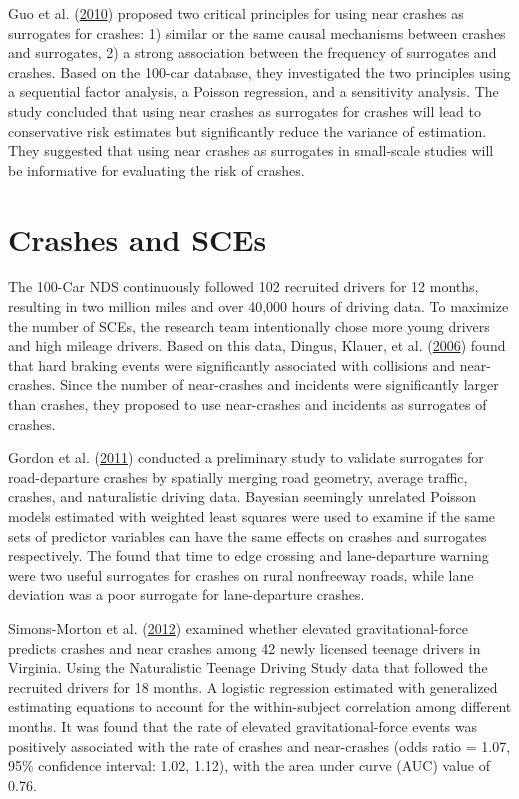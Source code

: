 \documentclass[12pt]{book}
\numberwithin{equation}{chapter}
\begin{document}
Guo et al. (\protect\hyperlink{ref-guo2010near}{2010}) proposed two critical principles for using near crashes as surrogates for crashes: 1) similar or the same causal mechanisms between crashes and surrogates, 2) a strong association between the frequency of surrogates and crashes. Based on the 100-car database, they investigated the two principles using a sequential factor analysis, a Poisson regression, and a sensitivity analysis. The study concluded that using near crashes as surrogates for crashes will lead to conservative risk estimates but significantly reduce the variance of estimation. They suggested that using near crashes as surrogates in small-scale studies will be informative for evaluating the risk of crashes.

\hypertarget{crashes-and-sces}{%
\section{Crashes and SCEs}\label{crashes-and-sces}}

The 100-Car NDS continuously followed 102 recruited drivers for 12 months, resulting in two million miles and over 40,000 hours of driving data. To maximize the number of SCEs, the research team intentionally chose more young drivers and high mileage drivers. Based on this data, Dingus, Klauer, et al. (\protect\hyperlink{ref-dingus2006100}{2006}) found that hard braking events were significantly associated with collisions and near-crashes. Since the number of near-crashes and incidents were significantly larger than crashes, they proposed to use near-crashes and incidents as surrogates of crashes.

Gordon et al. (\protect\hyperlink{ref-gordon2011analysis}{2011}) conducted a preliminary study to validate surrogates for road-departure crashes by spatially merging road geometry, average traffic, crashes, and naturalistic driving data. Bayesian seemingly unrelated Poisson models estimated with weighted least squares were used to examine if the same sets of predictor variables can have the same effects on crashes and surrogates respectively. The found that time to edge crossing and lane-departure warning were two useful surrogates for crashes on rural nonfreeway roads, while lane deviation was a poor surrogate for lane-departure crashes.

Simons-Morton et al. (\protect\hyperlink{ref-simons2012elevated}{2012}) examined whether elevated gravitational-force predicts crashes and near crashes among 42 newly licensed teenage drivers in Virginia. Using the Naturalistic Teenage Driving Study data that followed the recruited drivers for 18 months. A logistic regression estimated with generalized estimating equations to account for the within-subject correlation among different months. It was found that the rate of elevated gravitational-force events was positively associated with the rate of crashes and near-crashes (odds ratio = 1.07, 95\% confidence interval: 1.02, 1.12), with the area under curve (AUC) value of 0.76.
\end{document}
